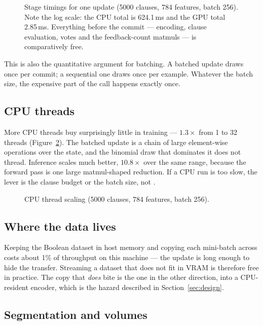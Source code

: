 \begin{figure}[htbp]
\centering

\caption{Stage timings for one update (5000 clauses, 784 features, batch 256). Note the log
  scale: the CPU total is 624.1\,ms and the GPU total 2.85\,ms. Everything before the commit
  --- encoding, clause evaluation, votes and the feedback-count matmuls --- is comparatively
  free.}
\label{fig:bench-breakdown}
\end{figure}

This is also the quantitative argument for batching. A batched update draws once per commit;
a sequential one draws once per example. Whatever the batch size, the expensive part of the
call happens exactly once.

\subsection{CPU threads}

More CPU threads buy surprisingly little in training --- $1.3\times$ from 1 to 32 threads
(Figure~\ref{fig:bench-threads}). The batched update is a chain of large element-wise
operations over the state, and the binomial draw that dominates it does not thread.
Inference scales much better, $10.8\times$ over the same range, because the forward pass is
one large matmul-shaped reduction. If a CPU run is too slow, the lever is the clause budget
or the batch size, not .

\begin{figure}[htbp]
\centering

\caption{CPU thread scaling (5000 clauses, 784 features, batch 256).}
\label{fig:bench-threads}
\end{figure}

\subsection{Where the data lives}

Keeping the Boolean dataset in host memory and copying each mini-batch across costs about
1\% of throughput on this machine --- the update is long enough to hide the transfer. Streaming
a dataset that does not fit in VRAM is therefore free in practice. The copy that \emph{does}
bite is the one in the other direction, into a CPU-resident encoder, which is the hazard
described in Section~\ref{sec:design}.

\subsection{Segmentation and volumes}
\label{sec:bench-new}

